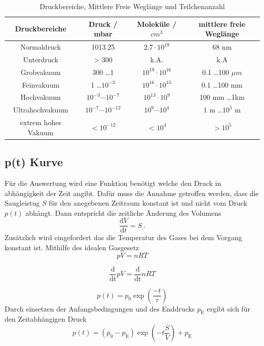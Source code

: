 \begin{table}
  \centering
  \caption{Druckbereiche, Mittlere Freie Weglänge und Teilchenanzahl}
  \begin{tabular}{c|c c c}
  	\toprule
	Druckbereiche & Druck / mbar & Moleküle / $cm^3$ & mittlere freie Weglänge \\
	\midrule
	Normaldruck	& 1013.25			& $2.7 \cdot 10^{19}$ &	68 nm \\
	Unterdruck	& > 300				& k.A. & k.A \\
	Grobvakuum	& 300 \ldots 1 			&$10^{19} \cdot 10^{16}$&0.1 \ldots 100 $\mu m$ \\
	Feinvakuum	& 1 \ldots $10^{-3}$		& $10^{16} \cdot 10^{13}$ & 0.1 \ldots 100 mm \\
	Hochvakuum	& $10^{-3} \cdots 10^{-7}$	& $10^{13} \cdot 10^{9}$ & 100 mm \ldots 1km \\
	Ultrahochvakuum	& $10^{-7} \cdots 10^{-12}$	& $10^9 \cdots 10^4$ & 1 m \ldots $10^5$ m \\
	extrem hohes Vakuum & $< 10^{-12}$		& $<10^4$ & $> 10^5$ \\
	\bottomrule
  \end{tabular}
  \label{tab:ueberblick}
\end{table}


\subsection{p(t) Kurve}
Für die Auswertung wird eine Funktion benötigt welche den Druck in abhängigkeit der Zeit angibt. Dafür muss die Annahme getroffen werden, dass die Saugleistug $S$ für den anegebenen Zeitraum konstant ist und nicht vom Druck $p(t)$ abhängt. Dann entspricht die zeitliche Änderung des Volumens 
\begin{equation}
  \frac{\text{d}V}{\text{d}t} = S \ .
\end{equation}
Zusätzlich wird eingefordert das die Temperatur des Gases bei dem Vorgang konstant ist. Mithilfe des idealen Gasgesetz
\begin{equation}
  p V = n R T
\end{equation}

\begin{equation}
  \frac{\text{d}}{\text{dt}} pV = \frac{\text{d}}{\text{dt}} n R T
\end{equation}

\begin{equation}
  p(t) = p_0 \exp \left( \frac{-t}{\tau} \right)
\end{equation}
Durch einsetzen der Anfangsbedingungen und des Enddrucks $p_\text{E}$ ergibt sich für den Zeitabhängigen Druck 
\begin{equation}
  p(t) = (p_0 - p_\text{E}) \exp \left( -t \frac{S}{V} \right) + p_\text{E}
\end{equation}

